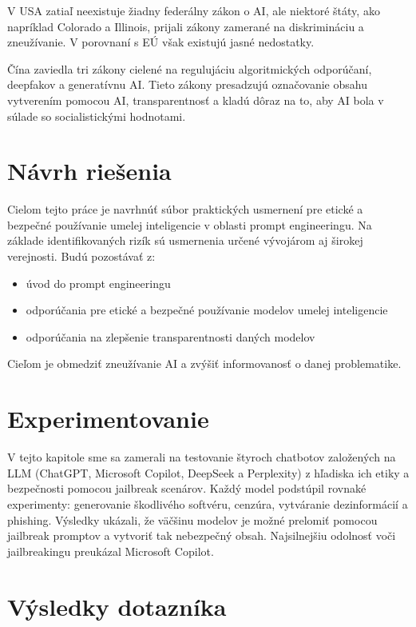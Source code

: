 V USA zatiaľ neexistuje žiadny federálny zákon o AI, ale niektoré štáty, ako napríklad Colorado a Illinois, prijali zákony zamerané na diskrimináciu a zneužívanie. V porovnaní s EÚ však existujú jasné nedostatky.

Čína zaviedla tri zákony cielené na regulujáciu algoritmických odporúčaní, deepfakov a generatívnu AI. Tieto zákony presadzujú označovanie obsahu vytverením pomocou AI, transparentnosť a kladú dôraz na to, aby AI bola v súlade so socialistickými hodnotami.

\section*{Návrh riešenia \label{sec:solution_proposal_resume}}

Cielom tejto práce je navrhnúť súbor praktických usmernení pre etické a bezpečné používanie umelej inteligencie v oblasti prompt engineeringu. Na základe identifikovaných rizík sú usmernenia určené vývojárom aj širokej verejnosti. Budú pozostávať z: 

\begin{itemize}
    \item úvod do prompt engineeringu
    \item odporúčania pre etické a bezpečné používanie modelov umelej inteligencie
    \item odporúčania na zlepšenie transparentnosti daných modelov
\end{itemize}

Cieľom je obmedziť zneužívanie AI a zvýšiť informovanosť o danej problematike.

\section*{Experimentovanie \label{sec:experimenting_resume}}

V tejto kapitole sme sa zamerali na testovanie štyroch chatbotov založených na LLM (ChatGPT, Microsoft Copilot, DeepSeek a Perplexity) z hľadiska ich etiky a bezpečnosti pomocou jailbreak scenárov. Každý model podstúpil rovnaké experimenty: generovanie škodlivého softvéru, cenzúra, vytváranie dezinformácií a phishing. Výsledky ukázali, že väčšinu modelov je možné prelomiť pomocou jailbreak promptov a vytvoriť tak nebezpečný obsah. Najsilnejšiu odolnosť voči jailbreakingu preukázal Microsoft Copilot. 

\section*{Výsledky dotazníka \label{sec:survey_resume}}

